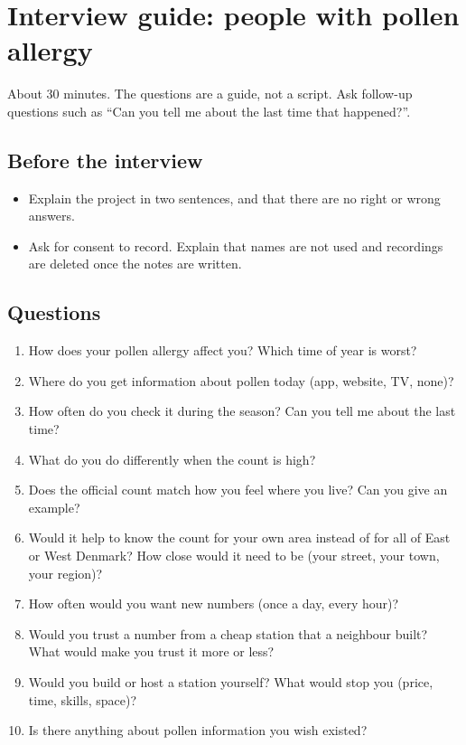 \chapter{Interview guide: people with pollen allergy}\label{app:interview-guide}


About 30 minutes. The questions are a guide, not a script. Ask follow-up questions such as
``Can you tell me about the last time that happened?''.

\section*{Before the interview}
\begin{itemize}
  \item Explain the project in two sentences, and that there are no right or wrong answers.
  \item Ask for consent to record. Explain that names are not used and recordings are deleted
  once the notes are written.
\end{itemize}

\section*{Questions}
\begin{enumerate}
  \item How does your pollen allergy affect you? Which time of year is worst?
  \item Where do you get information about pollen today (app, website, TV, none)?
  \item How often do you check it during the season? Can you tell me about the last time?
  \item What do you do differently when the count is high?
  \item Does the official count match how you feel where you live? Can you give an example?
  \item Would it help to know the count for your own area instead of for all of East or West
  Denmark? How close would it need to be (your street, your town, your region)?
  \item How often would you want new numbers (once a day, every hour)?
  \item Would you trust a number from a cheap station that a neighbour built? What would make
  you trust it more or less?
  \item Would you build or host a station yourself? What would stop you (price, time, skills,
  space)?
  \item Is there anything about pollen information you wish existed?
\end{enumerate}

